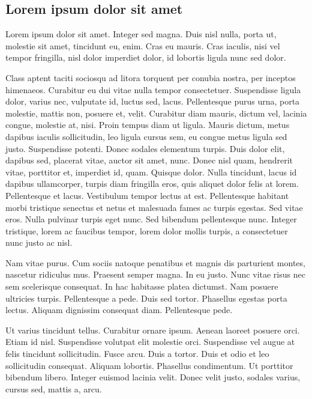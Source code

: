 \documentclass[../hdr.tex]{subfiles}
\begin{document}
\subsection{Lorem ipsum dolor sit amet}

Lorem ipsum dolor sit amet. Integer sed magna. Duis nisl nulla, porta ut,
molestie sit amet, tincidunt eu, enim. Cras eu mauris. Cras iaculis, nisi vel
tempor fringilla, nisl dolor imperdiet dolor, id lobortis ligula nunc sed dolor.

Class aptent taciti sociosqu ad litora torquent per conubia nostra, per inceptos
himenaeos. Curabitur eu dui vitae nulla tempor consectetuer. Suspendisse ligula
dolor, varius nec, vulputate id, luctus sed, lacus. Pellentesque purus urna,
porta molestie, mattis non, posuere et, velit. Curabitur diam mauris, dictum
vel, lacinia congue, molestie at, nisi. Proin tempus diam ut ligula. Mauris
dictum, metus dapibus iaculis sollicitudin, leo ligula cursus sem, eu congue
metus ligula sed justo. Suspendisse potenti. Donec sodales elementum turpis.
Duis dolor elit, dapibus sed, placerat vitae, auctor sit amet, nunc. Donec nisl
quam, hendrerit vitae, porttitor et, imperdiet id, quam. Quisque dolor. Nulla
tincidunt, lacus id dapibus ullamcorper, turpis diam fringilla eros, quis
aliquet dolor felis at lorem. Pellentesque et lacus. Vestibulum tempor lectus at
est. Pellentesque habitant morbi tristique senectus et netus et malesuada fames
ac turpis egestas. Sed vitae eros. Nulla pulvinar turpis eget nunc. Sed bibendum
pellentesque nunc. Integer tristique, lorem ac faucibus tempor, lorem dolor
mollis turpis, a consectetuer nunc justo ac nisl.

Nam vitae purus. Cum sociis natoque penatibus et magnis dis parturient montes,
nascetur ridiculus mus. Praesent semper magna. In eu justo. Nunc vitae risus nec
sem scelerisque consequat. In hac habitasse platea dictumst. Nam posuere
ultricies turpis. Pellentesque a pede. Duis sed tortor. Phasellus egestas porta
lectus. Aliquam dignissim consequat diam. Pellentesque pede.

Ut varius tincidunt tellus. Curabitur ornare ipsum. Aenean laoreet posuere orci.
Etiam id nisl. Suspendisse volutpat elit molestie orci. Suspendisse vel augue at
felis tincidunt sollicitudin. Fusce arcu. Duis a tortor. Duis et odio et leo
sollicitudin consequat. Aliquam lobortis. Phasellus condimentum. Ut porttitor
bibendum libero. Integer euismod lacinia velit. Donec velit justo, sodales
varius, cursus sed, mattis a, arcu.
\end{document}
